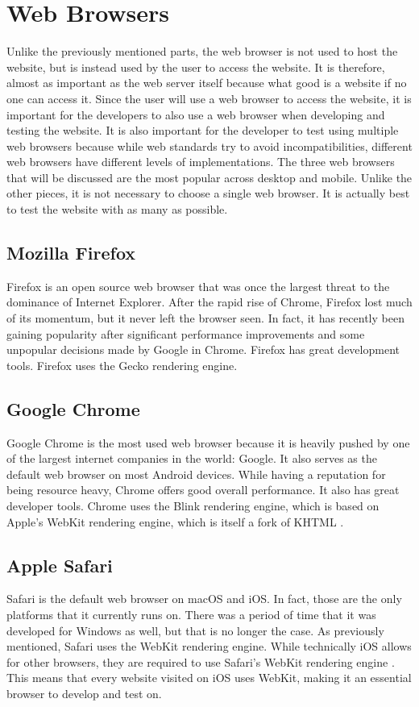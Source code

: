 \documentclass[10pt,draftclsnofoot,onecolumn,journal,compsoc]{IEEEtran}
\begin{document}
\section{Web Browsers}
Unlike the previously mentioned parts, the web browser is not used to host the website, but is instead used by the user to access the website. It is therefore, almost as important as the web server itself because what good is a website if no one can access it. Since the user will use a web browser to access the website, it is important for the developers to also use a web browser when developing and testing the website. It is also important for the developer to test using multiple web browsers because while web standards try to avoid incompatibilities, different web browsers have different levels of implementations. The three web browsers that will be discussed are the most popular across desktop and mobile. Unlike the other pieces, it is not necessary to choose a single web browser. It is actually best to test the website with as many as possible.

\subsection{Mozilla Firefox}
Firefox is an open source web browser that was once the largest threat to the dominance of Internet Explorer. After the rapid rise of Chrome, Firefox lost much of its momentum, but it never left the browser seen. In fact, it has recently been gaining popularity after significant performance improvements and some unpopular decisions made by Google in Chrome. Firefox has great development tools. Firefox uses the Gecko rendering engine.

\subsection{Google Chrome}
Google Chrome is the most used web browser because it is heavily pushed by one of the largest internet companies in the world: Google. It also serves as the default web browser on most Android devices. While having a reputation for being resource heavy, Chrome offers good overall performance. It also has great developer tools. Chrome uses the Blink rendering engine, which is based on Apple's WebKit rendering engine, which is itself a fork of KHTML \cite{khtmlwebkit}.

\subsection{Apple Safari}
Safari is the default web browser on macOS and iOS. In fact, those are the only platforms that it currently runs on. There was a period of time that it was developed for Windows as well, but that is no longer the case. As previously mentioned, Safari uses the WebKit rendering engine. While technically iOS allows for other browsers, they are required to use Safari's WebKit rendering engine \cite{iosrendering}. This means that every website visited on iOS uses WebKit, making it an essential browser to develop and test on.
\end{document}
